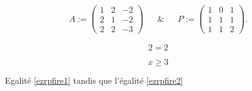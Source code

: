 \[\begin{aligned}
\label{ezrpfire1}
&A:=  \begin{pmatrix}1 & 2 & -2\\2 & 1 & -2\\2 & 2 & -3\end{pmatrix}&
& \& & 
&P:=  \begin{pmatrix}1 & 0 & 1\\1 & 1 & 1\\1 & 1 & 2\end{pmatrix}.&
\end{aligned}\]

\[2=2\]

\[\label{ezrpfire2}
x \geq 3\]

Egalité \protect\hyperlink{ezrpfire1}{{[}ezrpfire1{]}} tandis que
l'égalité \protect\hyperlink{ezrpfire2}{{[}ezrpfire2{]}}
